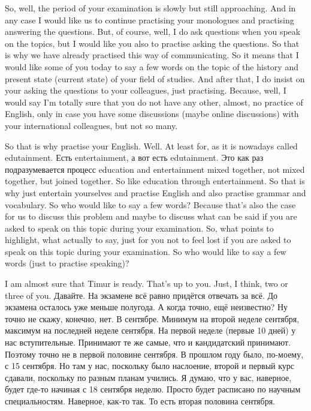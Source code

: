 \documentclass[main.tex]{subfiles}
\begin{document}

So, well, the period of your examination is slowly but still approaching.
And in any case I would like us to continue practising your monologues and practising answering the questions.
But, of course, well, I do ask questions when you speak on the topics, but I would like you also to practise asking the questions.
So that is why we have already practised this way of communicating.
So it means that I would like some of you today to say a few words on the topic of the history and present state (current state) of your field of studies.
And after that, I do insist on your asking the questions to your colleagues, just practising.
Because, well, I would say I'm totally sure that you do not have any other, almost, no practice of English, only in case you have some discussions (maybe online discussions) with your international colleagues, but not so many.

So that is why practise your English.
Well.
At least for, as it is nowadays called edutainment.
Есть entertainment, а вот есть edutainment.
Это как раз подразумевается процесс education and entertainment mixed together, not mixed together, but joined together.
So like education through entertainment.
So that is why just entertain yourselves and practise English and also practise grammar and vocabulary.
So who would like to say a few words?
Because that's also the case for us to discuss this problem and maybe to discuss what can be said if you are asked to speak on this topic during your examination.
So, what points to highlight, what actually to say, just for you not to feel lost if you are asked to speak on this topic during your examination.
So who would like to say a few words (just to practise speaking)?

I am almost sure that Timur is ready.
That's up to you.
Just, I think, two or three of you.
Давайте.
На экзамене всё равно придётся отвечать за всё.
До экзамена осталось уже меньше полугода.
А когда точно, ещё неизвестно?
Ну точно не скажу, конечно, нет.
В сентябре.
Минимум на второй неделе сентября, максимум на последней неделе сентября.
На первой неделе (первые 10 дней) у нас вступительные.
Принимают те же самые, что и кандидатский принимают.
Поэтому точно не в первой половине сентября.
В прошлом году было, по-моему, с 15 сентября.
Но там у нас, поскольку было наслоение, второй и первый курс сдавали, поскольку по разным планам учились.
Я думаю, что у вас, наверное, будет где-то начиная с 18 сентября неделю.
Просто будет расписано по научным специальностям.
Наверное, как-то так.
То есть вторая половина сентября.
\end{document}
